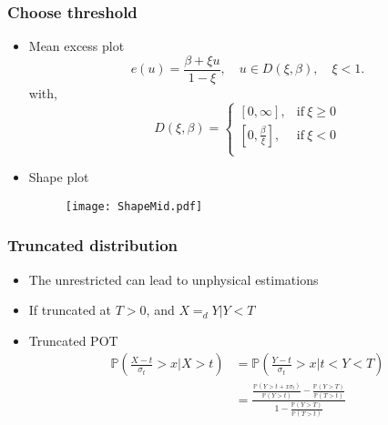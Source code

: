 \documentclass{beamer}
\begin{document}
\begin{frame}
\frametitle{Choose threshold}
\begin{itemize}
	\item Mean excess plot
	\begin{equation*}
	e(u) = \frac{\beta + \xi u}{1 - \xi}, \quad  u \in D(\xi,\beta),  \quad \xi < 1.
	\end{equation*}
	with,
	\begin{equation*}
	D(\xi, \beta) =
	\begin{cases}
	[0,\infty], & \text{if} \ \xi \geq 0 \\
	[0, \frac{\beta}{\xi}], & \text{if} \ \xi < 0 \\
	\end{cases}
	\end{equation*}
	\item Shape plot
		\begin{figure}
		\texttt{[image: ShapeMid.pdf]}
	\end{figure}
\end{itemize}
\end{frame}

\begin{frame}
\frametitle{Truncated distribution}
\begin{itemize}
	\item The unrestricted can lead to unphysical estimations
	\item If truncated at $T > 0$, and $X =_d Y | Y < T$
	\item Truncated POT
	\begin{equation*}
	\begin{split}
	\mathbb{P}\left(\frac{X - t}{\sigma _t} > x | X > t\right) & = \mathbb{P}\left(\frac{Y - t}{\sigma _t} > x | t < Y < T\right) \\
	& = \frac{\frac{\mathbb{P}(Y > t+x\sigma _t )}{\mathbb{P}(Y>t)} -  \frac{\mathbb{P}(Y > T)}{\mathbb{P}(T > t)}}{1 - \frac{\mathbb{P}(Y > T)}{\mathbb{P}(T>t)}}
	\end{split}
	\label{tPOT}
	\end{equation*}
\end{itemize}
\end{frame}
\end{document}
